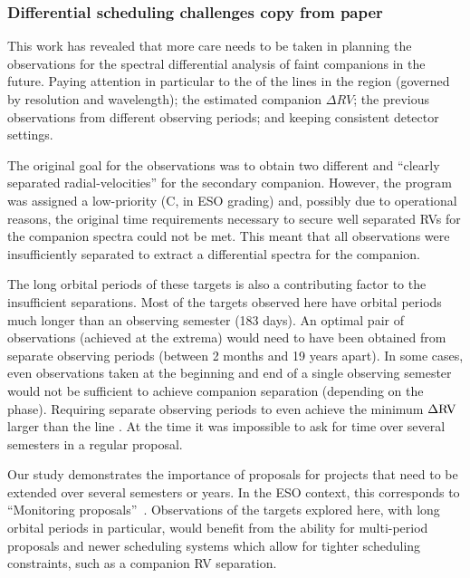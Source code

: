 







\subsubsection{Differential scheduling challenges {copy from paper}}
\label{subsubsec:differential-schedualing}
This work has revealed that more care needs to be taken in planning the observations for the spectral differential analysis of faint companions in the future.
Paying attention in particular to the {\fwhm} of the lines in the region (governed by resolution and wavelength); the estimated companion \(\Delta {RV}\); the previous observations from different observing periods; and keeping consistent detector settings.

The original goal for the observations was to obtain two different and ``clearly separated radial-velocities'' for the secondary companion.
However, the program was assigned a low-priority (C, in ESO grading) and, possibly due to operational reasons, the original time requirements necessary to secure well separated RVs for the companion spectra could not be met.
This meant that all observations were insufficiently separated to extract a differential spectra for the companion.

The long orbital periods of these targets is also a contributing factor to the insufficient separations.
Most of the targets observed here have orbital periods much longer than an observing semester (183 days).
An optimal pair of observations (achieved at the extrema) would need to have been obtained from separate observing periods (between 2 months and 19 years apart).
In some cases, even observations taken at the beginning and end of a single observing semester would not be sufficient to achieve companion separation (depending on the phase).
Requiring separate observing periods to even achieve the minimum \(\Delta \rm {RV}\) larger than the line {\fwhm}.
At the time it was impossible to ask for time over several semesters in a regular proposal.

Our study demonstrates the importance of proposals for projects that need to be extended over several semesters or years. In the ESO context, this corresponds to ``Monitoring proposals''~\citep[e.g.,][pg. 18]{eso_eso_2017}.
Observations of the targets explored here, with long orbital periods in particular, would benefit from the ability for multi-period proposals and newer scheduling systems which allow for tighter scheduling constraints, such as a companion {RV} separation.

